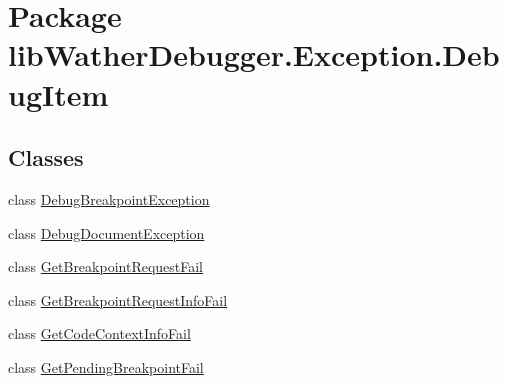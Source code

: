 \hypertarget{namespacelib_wather_debugger_1_1_exception_1_1_debug_item}{\section{Package lib\+Wather\+Debugger.\+Exception.\+Debug\+Item}
\label{namespacelib_wather_debugger_1_1_exception_1_1_debug_item}
}
\subsection*{Classes}
\begin{DoxyCompactItemize}
\item 
class \hyperlink{classlib_wather_debugger_1_1_exception_1_1_debug_item_1_1_debug_breakpoint_exception}{Debug\+Breakpoint\+Exception}
\item 
class \hyperlink{classlib_wather_debugger_1_1_exception_1_1_debug_item_1_1_debug_document_exception}{Debug\+Document\+Exception}
\item 
class \hyperlink{classlib_wather_debugger_1_1_exception_1_1_debug_item_1_1_get_breakpoint_request_fail}{Get\+Breakpoint\+Request\+Fail}
\item 
class \hyperlink{classlib_wather_debugger_1_1_exception_1_1_debug_item_1_1_get_breakpoint_request_info_fail}{Get\+Breakpoint\+Request\+Info\+Fail}
\item 
class \hyperlink{classlib_wather_debugger_1_1_exception_1_1_debug_item_1_1_get_code_context_info_fail}{Get\+Code\+Context\+Info\+Fail}
\item 
class \hyperlink{classlib_wather_debugger_1_1_exception_1_1_debug_item_1_1_get_pending_breakpoint_fail}{Get\+Pending\+Breakpoint\+Fail}
\end{DoxyCompactItemize}
